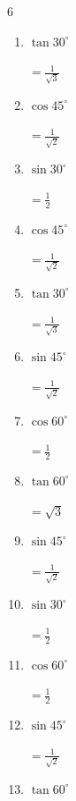 \begin{multicols}{6}
\begin{enumerate}
\columnbreak %

  \item $\displaystyle \tan{30^\circ}$

        $\displaystyle =\frac{1}{\sqrt{3}}$

  \item $\displaystyle \cos{45^\circ}$

        $\displaystyle =\frac{1}{\sqrt{2}}$

  \item $\displaystyle \sin{30^\circ}$

        $\displaystyle =\frac{1}{2}$

  \item $\displaystyle \cos{45^\circ}$

        $\displaystyle =\frac{1}{\sqrt{2}}$

  \item $\displaystyle \tan{30^\circ}$

        $\displaystyle =\frac{1}{\sqrt{3}}$

  \item $\displaystyle \sin{45^\circ}$

        $\displaystyle =\frac{1}{\sqrt{2}}$

  \item $\displaystyle \cos{60^\circ}$

        $\displaystyle =\frac{1}{2}$

  \item $\displaystyle \tan{60^\circ}$

        $\displaystyle =\sqrt{3}$

  \item $\displaystyle \sin{45^\circ}$

        $\displaystyle =\frac{1}{\sqrt{2}}$

  \item $\displaystyle \sin{30^\circ}$

        $\displaystyle =\frac{1}{2}$

  \item $\displaystyle \cos{60^\circ}$

        $\displaystyle =\frac{1}{2}$

  \item $\displaystyle \sin{45^\circ}$

        $\displaystyle =\frac{1}{\sqrt{2}}$

  \item $\displaystyle \tan{60^\circ}$


\end{enumerate}
\end{multicols}

